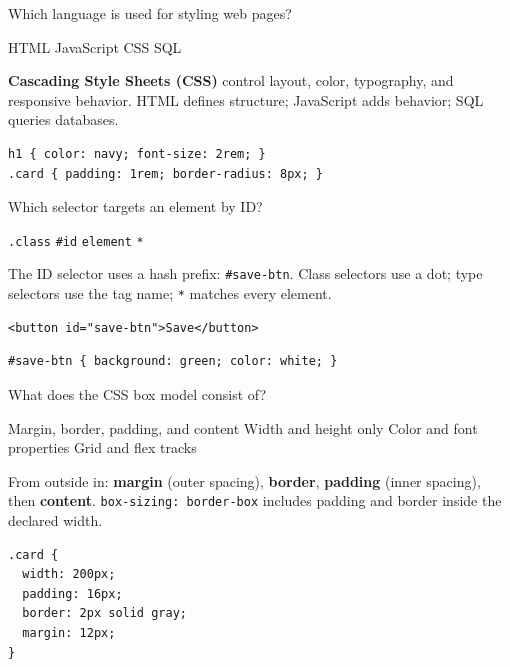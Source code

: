 \newpage


\question[4]
Which language is used for styling web pages?
\begin{choices}
  \choice HTML
  \choice JavaScript
  \CorrectChoice CSS
  \choice SQL
\end{choices}
\begin{solution}
  \textbf{Cascading Style Sheets (CSS)} control layout, color, typography, and responsive behavior. HTML defines structure; JavaScript adds behavior; SQL queries databases.
\begin{lstlisting}[style=css]
h1 { color: navy; font-size: 2rem; }
.card { padding: 1rem; border-radius: 8px; }
\end{lstlisting}
\end{solution}

\question[4]
Which selector targets an element by ID?
\begin{choices}
  \choice \texttt{.class}
  \CorrectChoice \texttt{\#id}
  \choice \texttt{element}
  \choice \texttt{*}
\end{choices}
\begin{solution}
  The ID selector uses a hash prefix: \lstinline[style=cssinline]|#save-btn|. Class selectors use a dot; type selectors use the tag name; \lstinline[style=cssinline]|*| matches every element.
\begin{lstlisting}[style=htmlinline]
<button id="save-btn">Save</button>
\end{lstlisting}
\begin{lstlisting}[style=css]
#save-btn { background: green; color: white; }
\end{lstlisting}
\end{solution}

\question[4]
What does the CSS box model consist of?
\begin{choices}
  \CorrectChoice Margin, border, padding, and content
  \choice Width and height only
  \choice Color and font properties
  \choice Grid and flex tracks
\end{choices}
\begin{solution}
  From outside in: \textbf{margin} (outer spacing), \textbf{border}, \textbf{padding} (inner spacing), then \textbf{content}. \lstinline[style=cssinline]|box-sizing: border-box| includes padding and border inside the declared width.
\begin{lstlisting}[style=css]
.card {
  width: 200px;
  padding: 16px;
  border: 2px solid gray;
  margin: 12px;
}
\end{lstlisting}
\end{solution}



